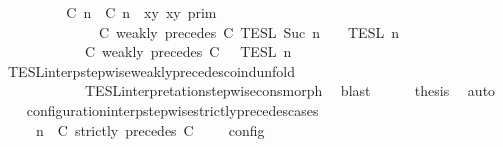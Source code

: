 \begin{isabellebody}
\ {\isacharminus}\isanewline
\ \ \ \ \isamarkupfalse%
\ {\isacartoucheopen}{\isasymlbrakk}\ {\isasymlceil}{\isacharhash}\isactrlsup {\isasymle}\ C\ n{\isacharcomma}\ {\isacharhash}\isactrlsup {\isasymle}\ C\ n{\isasymrceil}\ {\isasymin}\ {\isacharparenleft}{\isasymlambda}{\isacharparenleft}x{\isacharcomma}y{\isacharparenright}{\isachardot}\ x{\isasymle}y{\isacharparenright}\ {\isasymrbrakk}\isactrlsub p\isactrlsub r\isactrlsub i\isactrlsub m\isanewline
\ \ \ \ \ \ \ \ \ \ \ \ {\isasyminter}\ {\isasymlbrakk}\ C\ weakly\ precedes\ C\ {\isasymrbrakk}\isactrlsub T\isactrlsub E\isactrlsub S\isactrlsub L\isactrlbsup {\isasymge}\ Suc\ n\isactrlesup \ {\isasyminter}\ {\isasymlbrakk}{\isasymlbrakk}\ {\isasymPsi}\ {\isasymrbrakk}{\isasymrbrakk}\isactrlsub T\isactrlsub E\isactrlsub S\isactrlsub L\isactrlbsup {\isasymge}\ n\isactrlesup \isanewline
\ \ \ \ \ \ \ \ \ \ {\isacharequal}\ {\isasymlbrakk}{\isasymlbrakk}\ {\isacharparenleft}C\ weakly\ precedes\ C\ {\isacharhash}\ {\isasymPsi}\ {\isasymrbrakk}{\isasymrbrakk}\isactrlsub T\isactrlsub E\isactrlsub S\isactrlsub L\isactrlbsup {\isasymge}\ n\isactrlesup {\isacartoucheclose}\isanewline
\ \ \ \ \ \ \isamarkupfalse%
\ TESL{\isacharunderscore}interp{\isacharunderscore}stepwise{\isacharunderscore}weakly{\isacharunderscore}precedes{\isacharunderscore}coind{\isacharunderscore}unfold\isanewline
\ \ \ \ \ \ \ \ \ \ \ \ TESL{\isacharunderscore}interpretation{\isacharunderscore}stepwise{\isacharunderscore}cons{\isacharunderscore}morph\ \isamarkupfalse%
\ blast\isanewline
\ \ \ \ \isamarkupfalse%
\ {\isacharquery}thesis\ \isamarkupfalse%
\ auto\isanewline
\ \ \isamarkupfalse%
\isanewline
{}\isamarkupfalse%
%
\endisatagproof
{\isafoldproof}%
%
\isadelimproof
\isanewline
%
\endisadelimproof
\isanewline
{}\isamarkupfalse%
\ configuration{\isacharunderscore}interp{\isacharunderscore}stepwise{\isacharunderscore}strictly{\isacharunderscore}precedes{\isacharunderscore}cases{\isacharcolon}\isanewline
\ \ \ {\isacartoucheopen}{\isasymlbrakk}\ {\isasymGamma}{\isacharcomma}\ n\ {\isasymTurnstile}\ {\isacharparenleft}{\isacharparenleft}C\ strictly\ precedes\ C\ {\isacharhash}\ {\isasymPsi}{\isacharparenright}\ {\isasymtriangleright}\ {\isasymPhi}\ {\isasymrbrakk}\isactrlsub c\isactrlsub o\isactrlsub n\isactrlsub f\isactrlsub i\isactrlsub g\isanewline

\end{isabellebody}
